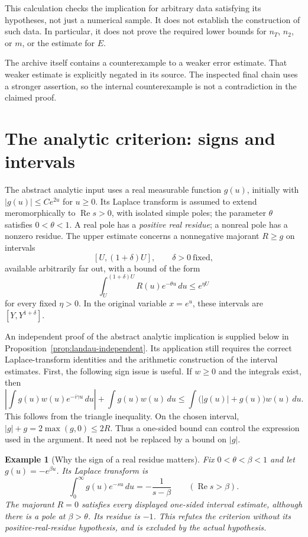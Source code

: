 \documentclass[11pt,a4paper]{article}
\newtheorem{example}[proposition]{Example}
\theoremstyle{remark}
\DeclareMathOperator{\Rea}{Re}
\newcommand{\src}[1]{\cite{#1}}
\begin{document}
This calculation checks the implication for arbitrary data satisfying its hypotheses, not just a numerical sample. It does not establish the construction of such data. In particular, it does not prove the required lower bounds for $n_T$, $n_2$, or $m$, or the estimate for $E$.

The archive itself contains a counterexample to a weaker error estimate. That weaker estimate is explicitly negated in its source. The inspected final chain uses a stronger assertion, so the internal counterexample is not a contradiction in the claimed proof. \src{S-weak}

\section{The analytic criterion: signs and intervals}\label{sec:landau}
The abstract analytic input uses a real measurable function $g(u)$, initially with $|g(u)|\le C e^{2u}$ for $u\ge0$. Its Laplace transform is assumed to extend meromorphically to $\Rea s>0$, with isolated simple poles; the parameter $\theta$ satisfies $0<\theta<1$. A real pole has a \emph{positive real residue}; a nonreal pole has a nonzero residue. The upper estimate concerns a nonnegative majorant $R\ge g$ on intervals
\[
 [U,(1+\delta)U],\qquad \delta>0\ \text{fixed},
\]
available arbitrarily far out, with a bound of the form
\[
 \int_U^{(1+\delta)U}R(u)e^{-\theta u}\,du\le e^{\eta U}
\]
for every fixed $\eta>0$. In the original variable $x=e^u$, these intervals are $[Y,Y^{1+\delta}]$. \src{S-landau}

An independent proof of the abstract analytic implication is supplied below in Proposition~\ref{prop:landau-independent}. Its application still requires the correct Laplace-transform identities and the arithmetic construction of the interval estimates. First, the following sign issue is useful. If $w\ge0$ and the integrals exist, then
\[
 \left|\int g(u)w(u)e^{-i\gamma u}\,du\right|
       +\int g(u)w(u)\,du
 \le\int\bigl(|g(u)|+g(u)\bigr)w(u)\,du.
\]
This follows from the triangle inequality. On the chosen interval,
$|g|+g=2\max(g,0)\le2R$. Thus a one-sided bound can control the expression used in the argument. It need not be replaced by a bound on $|g|$.

\begin{example}[Why the sign of a real residue matters]
Fix $0<\theta<\beta<1$ and let $g(u)=-e^{\beta u}$. Its Laplace transform is
\[
 \int_0^\infty g(u)e^{-su}\,du=-\frac1{s-\beta}
 \qquad(\Rea s>\beta).
\]
The majorant $R=0$ satisfies every displayed one-sided interval estimate, although there is a pole at $\beta>\theta$. Its residue is $-1$. This refutes the criterion \emph{without} its positive-real-residue hypothesis, and is excluded by the actual hypothesis.
\end{example}
\end{document}
